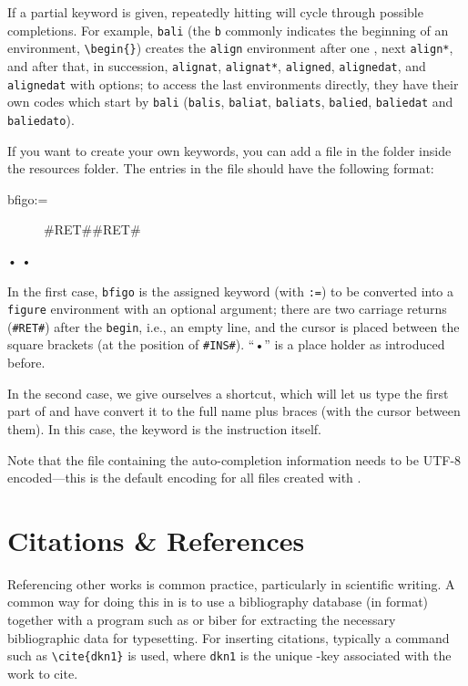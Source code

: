 If a partial keyword is given, repeatedly hitting  will cycle through possible completions. For example, \verb|bali| (the \verb|b| commonly indicates the beginning of an environment, \verb|\begin{}|) creates the \verb|align| environment after one , next \verb|align*|, and after that, in succession, \verb|alignat|, \verb|alignat*|, \verb|aligned|, \verb|alignedat|, and \verb|alignedat| with options; to access the last environments directly, they have their own codes which start by \verb|bali| (\verb|balis|, \verb|baliat|, \verb|baliats|, \verb|balied|, \verb|baliedat| and \verb|baliedato|).

If you want to create your own keywords, you can add a  file in the  folder inside the resources folder. The entries in the file should have the following format:
\begin{verbExample}
bfigo:=\begin{figure}[#INS#]#RET##RET#\end{figure}•
•
\end{verbExample}

In the first case, \verb|bfigo| is the assigned keyword (with \verb|:=|) to be converted into a \verb|figure| environment with an optional argument; there are two carriage returns (\verb|#RET#|) after the \verb|begin|, i.e., an empty line, and the cursor is placed between the square brackets (at the position of \verb|#INS#|). ``•'' is a place holder as introduced before.

In the second case, we give ourselves a shortcut, which will let us type the first part of \verb|| and have {\Tw} convert it to the full name plus braces (with the cursor between them). In this case, the keyword is the instruction itself.

Note that the  file containing the auto-completion information needs to be UTF-8 encoded---this is the default encoding for all files created with {\Tw}.

\section{Citations \& References}
\label{sec.citationsDialog}
Referencing other works is common practice, particularly in scientific writing. A common way for doing this in {\AllTeX} is to use a bibliography database (in {\BibTeX} format) together with a program such as {\BibTeX} or biber for extracting the necessary bibliographic data for typesetting. For inserting citations, typically a command such as \verb|\cite{dkn1}| is used, where \verb|dkn1| is the unique {\BibTeX}-key associated with the work to cite.

